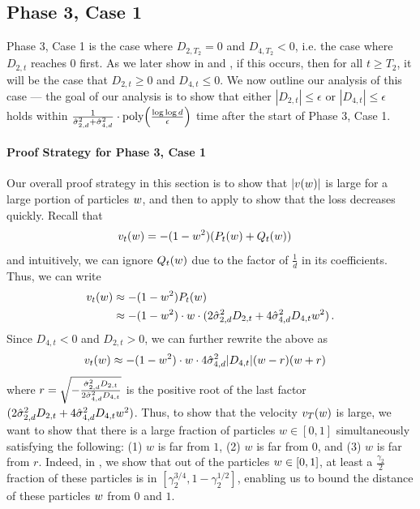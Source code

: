 \subsection{Phase 3, Case 1} \label{subsec:phase3_case1}

Phase 3, Case 1 is the case where $D_{2, T_2} = 0$ and $D_{4, T_2} < 0$, i.e. the case where $D_{2, t}$ reaches $0$ first. As we later show in  and , if this occurs, then for all $t \geq T_2$, it will be the case that $D_{2, t} \geq 0$ and $D_{4, t} \leq 0$. We now outline our analysis of this case --- the goal of our analysis is to show that either $|D_{2, t}| \leq \epsilon$ or $|D_{4, t}| \leq \epsilon$ holds within $\frac{1}{\hat{\sigma}_{2, d}^2 + \hat{\sigma}_{4, d}^2} \cdot \textup{poly}\Big(\frac{\log \log d}{\epsilon}\Big)$ time after the start of Phase 3, Case 1.

\paragraph{Proof Strategy for Phase 3, Case 1} Our overall proof strategy in this section is to show that $|v(w)|$ is large for a large portion of particles $w$, and then to apply  to show that the loss decreases quickly. Recall that
\begin{align}
v_t(w)
& = -(1 - w^2)(P_t(w) + Q_t(w))
\end{align}
and intuitively, we can ignore $Q_t(w)$ due to the factor of $\frac{1}{d}$ in its coefficients. Thus, we can write
\begin{align}
v_t(w) 
& \approx -(1 - w^2) P_t(w) \\
& \approx -(1 - w^2) \cdot w \cdot (2 \hat{\sigma}_{2, d}^2 D_{2, t} + 4 \hat{\sigma}_{4, d}^2 D_{4, t} w^2) \,.
\end{align}
Since $D_{4, t} < 0$ and $D_{2, t} > 0$, we can further rewrite the above as
\begin{align}
v_t(w)
& \approx -(1 - w^2) \cdot w \cdot 4 \hat{\sigma}_{4, d}^2 |D_{4, t}| (w - r) (w + r)
\end{align}
where $r = \sqrt{-\frac{\hat{\sigma}_{2, d}^2 D_{2, t}}{2 \hat{\sigma}_{4, d}^2 D_{4, t}}}$ is the positive root of the last factor $(2 \hat{\sigma}_{2, d}^2 D_{2, t} + 4 \hat{\sigma}_{4, d}^2 D_{4, t} w^2)$. Thus, to show that the velocity $v_T(w)$ is large, we want to show that there is a large fraction of particles $w \in [0, 1]$ simultaneously satisfying the following: (1) $w$ is far from $1$, (2) $w$ is far from $0$, and (3) $w$ is far from $r$. Indeed, in , we show that out of the particles $w \in [0, 1]$, at least a $\frac{\gamma_2}{2}$ fraction of these particles is in $[\gamma_2^{3/4}, 1 - \gamma_2^{1/2}]$, enabling us to bound the distance of these particles $w$ from $0$ and $1$.

